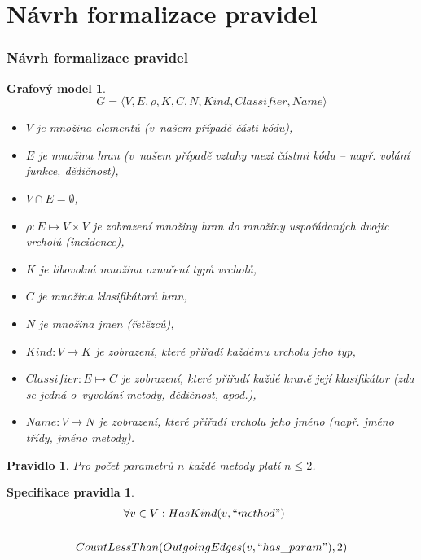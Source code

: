 \documentclass{beamer}
\newtheorem*{rulespec}{Pravidlo}
\newtheorem*{rulemathspec}{Specifikace pravidla}
\newtheorem*{graphmodel}{Grafový model}
\begin{document}
\section{Návrh formalizace pravidel}
\begin{frame}
  \frametitle{Návrh formalizace pravidel}
   {
    \begin{graphmodel}
      \begin{displaymath}
        G = \langle V, E, \rho, K, C, N, \mathit{Kind}, \mathit{Classifier}, \mathit{Name}\rangle
      \end{displaymath}
      \tiny
      \begin{itemize}
      \item $V$ je množina elementů (v~našem případě části kódu),
      \item $E$ je množina hran (v~našem případě vztahy mezi částmi kódu -- např. volání funkce, dědičnost),
      \item $V \cap E = \emptyset$,
      \item $\rho: E \mapsto V \times V$ je zobrazení množiny hran do množiny uspořádaných dvojic vrcholů (incidence),
      \item $K$ je libovolná množina označení typů vrcholů,
      \item $C$ je množina klasifikátorů hran,
      \item $N$ je množina jmen (řetězců),
      \item $\mathit{Kind}: V \mapsto K$ je zobrazení, které přiřadí každému vrcholu jeho typ,
      \item $\mathit{Classifier}: E \mapsto C$ je zobrazení, které přiřadí každé hraně její klasifikátor (zda se jedná o~vyvolání metody, dědičnost, apod.),
      \item $\mathit{Name}: V \mapsto N$ je zobrazení, které přiřadí vrcholu jeho jméno (např. jméno třídy, jméno metody).
      \end{itemize}
    \end{graphmodel}
  }
   {
    \begin{rulespec}
      Pro počet parametrů $n$ každé metody platí $n \leq 2$.
    \end{rulespec}
    \begin{rulemathspec}
      \begin{align*}
        \forall v \in V &: HasKind(v, ``method") \\
        \\
        CountLessThan&(OutgoingEdges(v, ``has\_param"), 2)
      \end{align*}

\end{rulemathspec}}
\end{frame}
\end{document}
